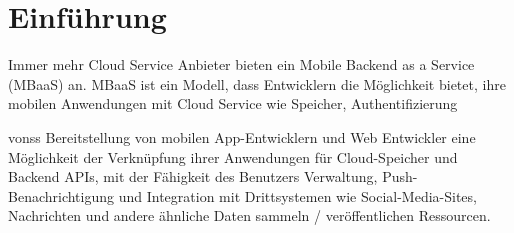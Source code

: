 \section{Einführung}
Immer mehr Cloud Service Anbieter bieten ein Mobile Backend as a Service (MBaaS) an.
 MBaaS ist ein Modell, dass Entwicklern die Möglichkeit bietet, ihre mobilen Anwendungen mit Cloud Service wie Speicher, Authentifizierung 

 vonss
Bereitstellung von mobilen App-Entwicklern und Web Entwickler eine Möglichkeit der Verknüpfung ihrer
Anwendungen für Cloud-Speicher und Backend
APIs, mit der Fähigkeit des Benutzers
Verwaltung, Push-Benachrichtigung und
Integration mit Drittsystemen wie
Social-Media-Sites, Nachrichten und andere ähnliche
Daten sammeln / veröffentlichen Ressourcen.
